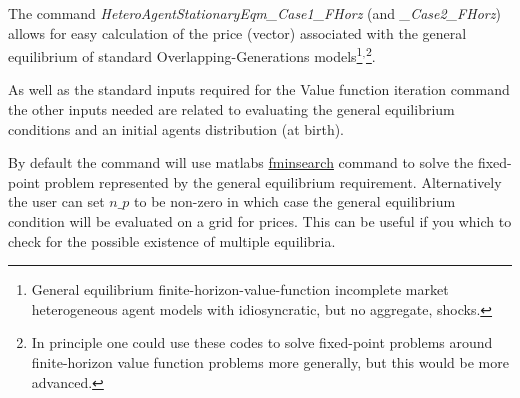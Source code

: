The command \textit{HeteroAgentStationaryEqm\_{}Case1\_{}FHorz} (and \textit{\_{}Case2\_{}FHorz}) allows for easy calculation of the price (vector) associated with the general equilibrium of
standard Overlapping-Generations models\footnote{General equilibrium finite-horizon-value-function incomplete market heterogeneous agent models with idiosyncratic, but no aggregate, shocks.}$^{,}$\footnote{In
principle one could use these codes to solve fixed-point problems around finite-horizon value function problems more generally, but this would be more advanced.}.

As well as the standard inputs required for the Value function iteration command the other inputs needed are related to evaluating the general equilibrium
conditions and an initial agents distribution (at birth).

By default the command will use matlabs \href{http://www.mathworks.com/help/matlab/ref/fminsearch.html}{fminsearch} command to solve the fixed-point problem represented by the general equilibrium requirement.
Alternatively the user can set $n\_{}p$ to be non-zero in which case the general equilibrium condition will be evaluated on a grid for prices. This can
be useful if you which to check for the possible existence of multiple equilibria.

